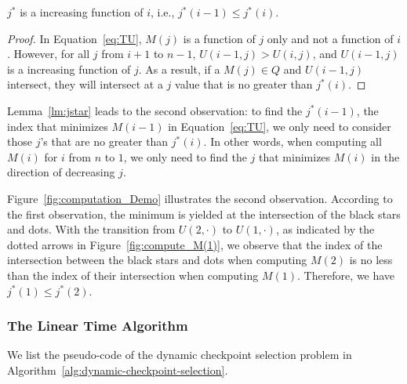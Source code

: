 

\begin{lemma} \label{lm:jstar}
$j^*$ is a increasing function of $i$, i.e., $j^*(i-1) \leq j^*(i)$.
\end{lemma}
\begin{proof}
In Equation~\ref{eq:TU}, $M(j)$ is a function of $j$ only and not a function of $i$.
However, for all $j$ from $i + 1$ to $n - 1$, $U(i - 1, j) > U(i, j)$, and $U(i - 1, j)$ is a increasing function of $j$.
As a result, if a $M(j) \in Q$ and $U(i-1, j)$ intersect, they will intersect at a $j$ value that is no greater than $j^*(i)$.
\end{proof}

Lemma~\ref{lm:jstar} leads to the second observation: to find the $j^*(i - 1)$, the index that minimizes $M(i - 1)$ in Equation~\ref{eq:TU}, we only need to consider those $j$'s that are no greater than $j^*(i)$.
In other words, when computing all $M(i)$ for $i$ from $n$ to $1$, we only need to find the $j$ that minimizes $M(i)$ in the direction of decreasing $j$.

Figure~\ref{fig:computation_Demo} illustrates the second observation.
According to the first observation, the minimum is yielded at the intersection of the black stars and dots.
With the transition from $U(2,\cdot)$ to $U(1,\cdot)$, as indicated by the dotted arrows in Figure~\ref{fig:compute_M(1)}, we observe that the index of the intersection between the black stars and dots when computing $M(2)$ is no less than the index of their intersection when computing $M(1)$.
Therefore, we have $j^*(1) \leq j^*(2)$.


\subsubsection{The Linear Time Algorithm}
We list the pseudo-code of the dynamic checkpoint selection problem in Algorithm~\ref{alg:dynamic-checkpoint-selection}.

